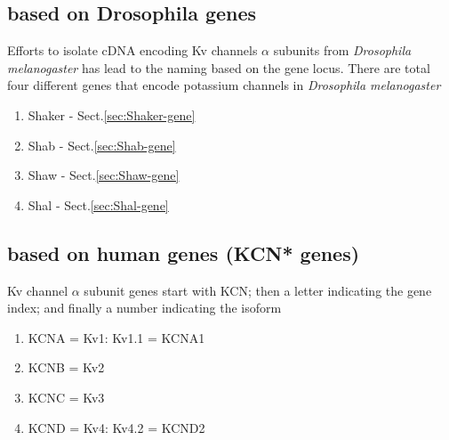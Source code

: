 \subsection{based on Drosophila genes}
\label{sec:K+-channel-classification-Drosophila-genes}
\label{sec:nomenclature-K_channel-based-Drosophila-genes}


Efforts to isolate cDNA encoding Kv channels $\alpha$ subunits from {\it
Drosophila melanogaster} has lead to the naming based on the gene locus.
There are total four different genes that encode potassium channels in {\it
Drosophila melanogaster}
\begin{enumerate}
  \item Shaker - Sect.\ref{sec:Shaker-gene}
  \item Shab - Sect.\ref{sec:Shab-gene}
  \item Shaw - Sect.\ref{sec:Shaw-gene}
  \item Shal - Sect.\ref{sec:Shal-gene}
\end{enumerate}

\subsection{based on human genes (KCN* genes)}
\label{sec:K+-channel-classification-human-genes}
\label{sec:nomenclature-K_channel-based-Human-genes}

Kv channel $\alpha$ subunit genes start with KCN; then a letter indicating the
gene index; and finally a number indicating the isoform
\begin{enumerate}
  \item KCNA = Kv1: Kv1.1 = KCNA1
  \item KCNB = Kv2
  \item KCNC = Kv3
  \item KCND = Kv4: Kv4.2 = KCND2
\end{enumerate}

